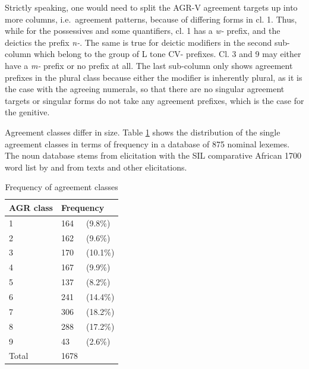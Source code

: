
Strictly speaking, one would need to split the AGR-V agreement targets up into more columns, i.e.\ agreement patterns, because of differing forms in cl. 1. Thus, while for the possessives and some quantifiers, cl. 1 has a {\itshape w-} prefix, and the deictics the prefix {\itshape n-}. The same is true for deictic modifiers in the second sub-column which belong to the group of L tone CV- prefixes. Cl. 3 and 9 may either have a {\itshape m-} prefix or no prefix at all. The last sub-column only shows agreement prefixes in the plural class because either the modifier is inherently plural, as it is the case with the agreeing numerals, so that there are no singular agreement targets or singular forms do not take any agreement prefixes, which is the case for the genitive.  

Agreement classes differ in size. Table \ref{Tab:AGRno} shows the distribution of the single agreement classes in terms of frequency in a database of 875 nominal lexemes. The noun database stems from elicitation with the SIL comparative African 1700 word list by \citet{roberts2006} and from texts and other elicitations.

\begin{table} 
\centering
\begin{tabular}{l|ll}
 \midrule
AGR class &  \multicolumn{2}{l}{Frequency}  \\ %
 \midrule
1 & 164 & (9.8\%)  \\ %
2  & 162 & (9.6\%) \\
3  &  170 & (10.1\%)   \\ %
4   & 167 & (9.9\%) \\
5   & 137 & (8.2\%) \\
6  &  241 & (14.4\%) \\
7   &  306 & (18.2\%) \\
8   & 288 & (17.2\%) \\
9   & 43 & (2.6\%) \\
 \midrule
Total & 1678 & \\
 \midrule
\end{tabular}
\caption{Frequency of agreement classes}
\label{Tab:AGRno}
\end{table}

